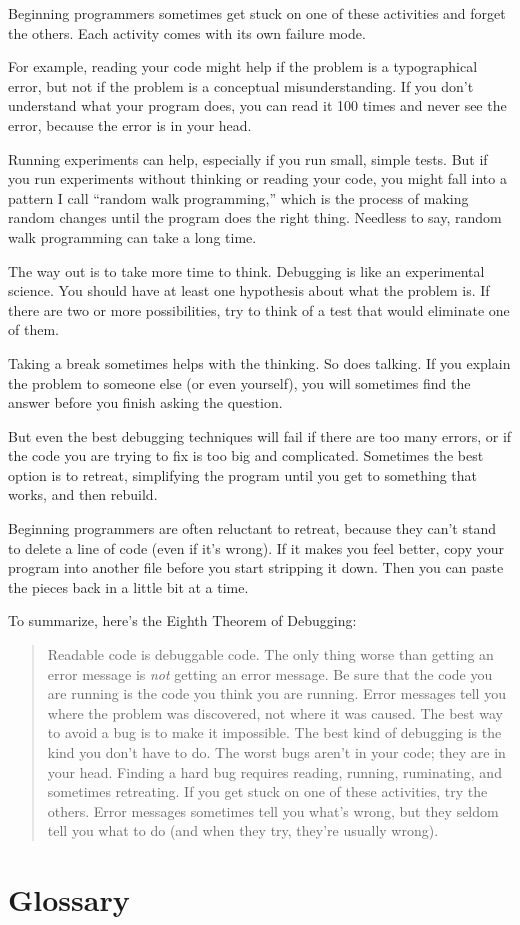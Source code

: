 \documentclass[
]{book}
\numberwithin{Answer}{chapter}
\numberwithin{Exercise}{chapter}
\newcommand{\displaythrm}[1]{%
    \ifthenelse{\equal{#1}{1}}%
        {Readable code is debuggable code.}{%
    \ifthenelse{\equal{#1}{2}}%
        {The only thing worse than getting an error message is {\em
         not} getting an error message.}{%
    \ifthenelse{\equal{#1}{3}}%
        {Be sure that the code you are running
         is the code you think you are running.}{%
    \ifthenelse{\equal{#1}{4}}%
        {Error messages tell you where the problem was discovered,
         not where it was caused.}{%
    \ifthenelse{\equal{#1}{5}}%
        {The best way to avoid a bug is to make it impossible.}{%
    \ifthenelse{\equal{#1}{6}}%
        {The best kind of debugging is the kind you don't have to do.}{%
    \ifthenelse{\equal{#1}{7}}%
        {The worst bugs aren't in your code; they are in your head.}{%
    \ifthenelse{\equal{#1}{8}}%
        {Finding a hard bug requires reading, running, ruminating,
         and sometimes retreating.  If you get stuck on one of these
         activities, try the others.}{%
    \ifthenelse{\equal{#1}{9}}%
        {Error messages sometimes tell you what's wrong, but they
         seldom tell you what to do (and when they try, they're usually
         wrong).}{%
    {}%
}}}}}}}}}}%
\begin{document}
Beginning programmers sometimes get stuck on one of these activities
and forget the others.  Each activity comes with its own failure
mode.

For example, reading your code might help if the problem is a
typographical error, but not if the problem is a conceptual
misunderstanding.  If you don't understand what your program does, you
can read it 100 times and never see the error, because the error is in
your head.

Running experiments can help, especially if you run small, simple
tests.  But if you run experiments without thinking or reading your
code, you might fall into a pattern I call ``random walk programming,''
which is the process of making random changes until the program
does the right thing.  Needless to say, random walk programming
can take a long time.


The way out is to take more time to think.  Debugging is like an
experimental science.  You should have at least one hypothesis about
what the problem is.  If there are two or more possibilities, try to
think of a test that would eliminate one of them.


Taking a break sometimes helps with the thinking.  So does talking.
If you explain the problem to someone else (or even yourself), you
will sometimes find the answer before you finish asking the question.

But even the best debugging techniques will fail if there are too many
errors, or if the code you are trying to fix is too big and
complicated.  Sometimes the best option is to retreat, simplifying the
program until you get to something that works, and then rebuild.

Beginning programmers are often reluctant to retreat, because
they can't stand to delete a line of code (even if it's wrong).
If it makes you feel better, copy your program into another file
before you start stripping it down.  Then you can paste the pieces
back in a little bit at a time.


To summarize, here's the Eighth Theorem of Debugging:

\begin{quote}
\displaythrm{8}
\end{quote}


\section{Glossary}
\end{document}
